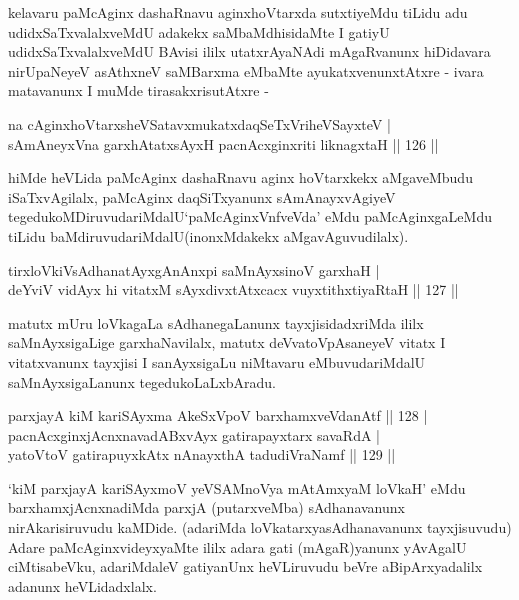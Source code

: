 \begin{artha}
kelavaru paMcAginx dashaRnavu aginxhoVtarxda sutxtiyeMdu tiLidu adu
udidxSaTxvalalxveMdU adakekx saMbaMdhisidaMte I gatiyU
udidxSaTxvalalxveMdU BAvisi ililx utatxrAyaNAdi mAgaRvanunx hiDidavara
nirUpaNeyeV asAthxneV saMBarxma eMbaMte ayukatxvenunxtAtxre - ivara
matavanunx I muMde tirasakxrisutAtxre -
\end{artha}

\begin{shl}
na cAginxhoVtarxsheVSatavxmukatxdaqSeTxVriheVSayxteV | \\
sAmAneyxVna garxhAtatxsAyxH pacnAcxginxriti liknagxtaH \hfill|| 126 || 
\end{shl}

\begin{artha}
hiMde heVLida paMcAginx dashaRnavu aginx hoVtarxkekx aMgaveMbudu
iSaTxvAgilalx, paMcAginx daqSiTxyanunx sAmAnayxvAgiyeV
tegedukoMDiruvudariMdalU\break `paMcAginxVnfveVda' eMdu paMcAginxgaLeMdu
tiLidu baMdiruvudariMdalU\break (inonxMdakekx aMgavAguvudilalx).
\end{artha}

\begin{shl}
tirxloVkiVsAdhanatAyxgAnAnxpi saMnAyxsinoV garxhaH | \\
deYviV vidAyx hi vitatxM sAyxdivxtAtxcacx vuyxtithxtiyaRtaH \hfill|| 127 || 
\end{shl}

\begin{artha}
matutx mUru loVkagaLa sAdhanegaLanunx tayxjisidadxriMda ililx
saMnAyxsigaLige garxhaNavilalx, matutx deVvatoVpAsaneyeV vitatx I
vitatxvanunx tayxjisi I sanAyxsigaLu niMtavaru eMbuvudariMdalU
saMnAyxsigaLanunx tegedukoLaLxbAradu.
\end{artha}


\begin{shl}
parxjayA kiM kariSAyxma AkeSxVpoV barxhamxveVdanAtf \hfill|| 128 | \\
pacnAcxginxjAcnxnavadABxvAyx gatirapayxtarx savaRdA | \\
yatoV\s toV gatirapuyxkAtx nAnayxthA tadudiVraNamf \hfill|| 129 || 
\end{shl}

\begin{artha}
`kiM parxjayA kariSAyxmoV yeVSAMnoV\s ya mAtAmxyaM loVkaH' eMdu barxhamxjAcnxnadiMda parxjA (putarxveMba) sAdhanavanunx  nirAkarisiruvudu kaMDide. (adariMda loVkatarxyasAdhanavanunx tayxjisuvudu) Adare paMcAginxvideyxyaMte ililx adara gati  (mAgaR)yanunx yAvAgalU ciMtisabeVku, adariMdaleV gatiyanUnx  heVLiruvudu beVre aBipArxyadalilx adanunx heVLidadxlalx.
\end{artha}

